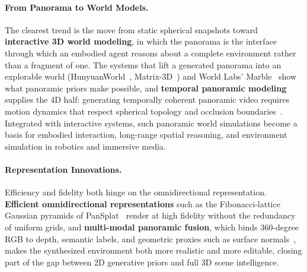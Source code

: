 \paragraph{From Panorama to World Models.}
The clearest trend is the move from static spherical snapshots toward \textbf{interactive 3D world modeling}, in which the panorama is the interface through which an embodied agent reasons about a complete environment rather than a fragment of one.
The systems that lift a generated panorama into an explorable world (HunyuanWorld~\cite{team2025hunyuanworld}, Matrix-3D~\cite{yang2025matrix}) and World Labs' Marble~\cite{Feifei2025Marble} show what panoramic priors make possible, and \textbf{temporal panoramic modeling} supplies the 4D half: generating temporally coherent panoramic video requires motion dynamics that respect spherical topology and occlusion boundaries~\cite{panflow,yin2025panoworld}.
Integrated with interactive systems, such panoramic world simulations become a basis for embodied interaction, long-range spatial reasoning, and environment simulation in robotics and immersive media.

\paragraph{Representation Innovations.}
Efficiency and fidelity both hinge on the omnidirectional representation.
\textbf{Efficient omnidirectional representations} such as the Fibonacci-lattice Gaussian pyramids of PanSplat~\cite{pansplat} render at high fidelity without the redundancy of uniform grids, and \textbf{multi-modal panoramic fusion}, which binds 360-degree RGB to depth, semantic labels, and geometric proxies such as surface normals~\cite{yang2024layerpano3d,scene4u}, makes the synthesized environment both more realistic and more editable, closing part of the gap between 2D generative priors and full 3D scene intelligence.
